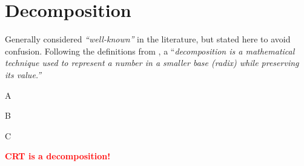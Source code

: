 
\chapter{Decomposition}
Generally considered \textit{``well-known''} in the literature, but stated here to avoid confusion. Following the definitions from \cite{fhetextbook}, a ``\textit{decomposition is a mathematical technique used to represent a number in a smaller base (radix) while preserving its value.''}

\begin{definition}
    A
\end{definition}

\begin{definition}
    B
\end{definition}

\begin{definition}
    C
\end{definition}

\textcolor{red}{\textbf{CRT is a decomposition!}}